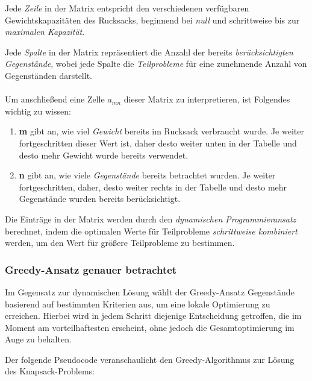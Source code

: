 Jede \textit{Zeile} in der Matrix entspricht den verschiedenen verfügbaren Gewichtskapazitäten des Rucksacks, beginnend
bei \textit{null} und schrittweise bis zur \textit{maximalen Kapazität}.

Jede \textit{Spalte} in der Matrix repräsentiert die Anzahl der bereits \textit{berücksichtigten Gegenstände}, wobei jede
Spalte die \textit{Teilprobleme} für eine zunehmende Anzahl von Gegenständen darstellt.\\
\\
Um anschließend eine Zelle \( a_{mn} \) dieser Matrix zu interpretieren, ist Folgendes wichtig zu wissen:
\begin{enumerate}
\item \textbf{m} gibt an, wie viel \textit{Gewicht} bereits im Rucksack verbraucht wurde. Je weiter fortgeschritten dieser
Wert ist, daher desto weiter unten in der Tabelle und desto mehr Gewicht wurde bereits verwendet.
\item \textbf{n} gibt an, wie viele \textit{Gegenstände} bereits betrachtet wurden. Je weiter fortgeschritten, daher,
desto weiter rechts in der Tabelle und desto mehr Gegenstände wurden bereits berücksichtigt.
\end{enumerate}

Die Einträge in der Matrix werden durch den \textit{dynamischen Programmieransatz} berechnet, indem die optimalen Werte für
Teilprobleme \textit{schrittweise kombiniert} werden, um den Wert für größere Teilprobleme zu bestimmen.

\subsubsection*{Greedy-Ansatz genauer betrachtet}
Im Gegensatz zur dynamischen Lösung wählt der Greedy-Ansatz Gegenstände basierend auf bestimmten Kriterien aus, um eine
lokale Optimierung zu erreichen. Hierbei wird in jedem Schritt diejenige Entscheidung getroffen, die im Moment am
vorteilhaftesten erscheint, ohne jedoch die Gesamtoptimierung im Auge zu behalten.

Der folgende Pseudocode veranschaulicht den Greedy-Algorithmus zur Lösung des Knapsack-Problems:

